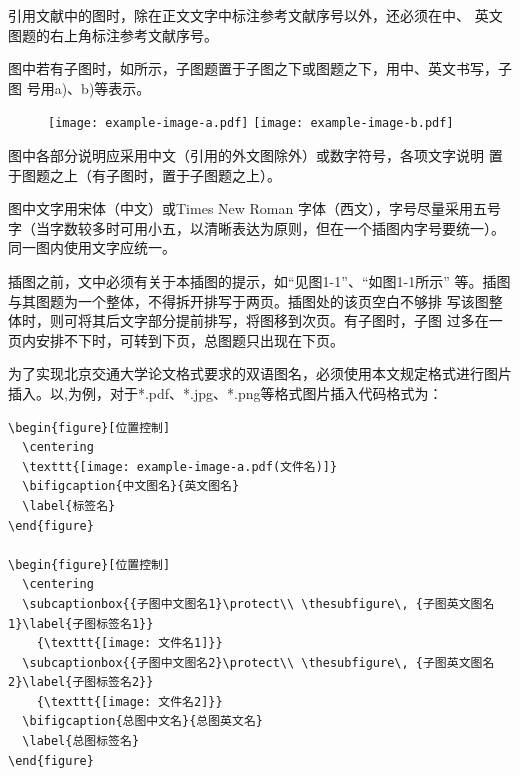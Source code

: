 引用文献中的图\cite{TUN2025LaTeXThesisTe}时，除在正文文字中标注参考文献序号以外，还必须在中、
英文图题的右上角标注参考文献序号。

图中若有子图时，如所示，子图题置于子图之下或图题之下，用中、英文书写，子图
号用a)、b)等表示。

\begin{figure}
  \centering
    {\texttt{[image: example-image-a.pdf]}}
    {\texttt{[image: example-image-b.pdf]}}
  \label{fig:eg2}
\end{figure}

图中各部分说明应采用中文（引用的外文图除外）或数字符号，各项文字说明
置于图题之上（有子图时，置于子图题之上）。

图中文字用宋体（中文）或Times New Roman 字体（西文），字号尽量采用五号字（当字数较多时可用小五，以清晰表达为原则，但在一个插图内字号要统一）。同一图内使用文字应统一。

插图之前，文中必须有关于本插图的提示，如“见图1-1”、“如图1-1所示”
等。插图与其图题为一个整体，不得拆开排写于两页。插图处的该页空白不够排
写该图整体时，则可将其后文字部分提前排写，将图移到次页。有子图时，子图
过多在一页内安排不下时，可转到下页，总图题只出现在下页。

为了实现北京交通大学论文格式要求的双语图名，必须使用本文规定格式进行图片插入。以,为例，对于*.pdf、*.jpg、*.png等格式图片插入代码格式为：

\begin{lstlisting}[language={[LaTeX]TeX}]
\begin{figure}[位置控制]
  \centering
  \texttt{[image: example-image-a.pdf(文件名)]}
  \bifigcaption{中文图名}{英文图名}
  \label{标签名}
\end{figure}

\begin{figure}[位置控制]
  \centering
  \subcaptionbox{{子图中文图名1}\protect\\ \thesubfigure\, {子图英文图名1}\label{子图标签名1}}
    {\texttt{[image: 文件名1]}}
  \subcaptionbox{{子图中文图名2}\protect\\ \thesubfigure\, {子图英文图名2}\label{子图标签名2}}
    {\texttt{[image: 文件名2]}}
  \bifigcaption{总图中文名}{总图英文名}
  \label{总图标签名}
\end{figure}
\end{lstlisting}

